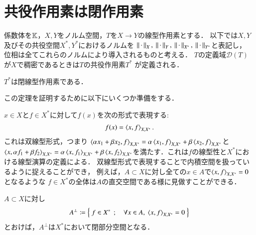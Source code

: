 \section{共役作用素は閉作用素}
	係数体を$\mathbb{K}$，$X,Y$をノルム空間，$T$を$X \rightarrow Y$の線型作用素とする．
	以下では$X,Y$及びその共役空間$X^*,Y^*$におけるノルムを
	$\Norm{\cdot}{X},\ \Norm{\cdot}{Y},\ \Norm{\cdot}{X^*},\ \Norm{\cdot}{Y^*}$と表記し，
	位相は全てこれらのノルムにより導入されるものと考える．
	$T$の定義域$\mathscr{D}(T)$が$X$で稠密であるときは$T$の共役作用素$T^*$
	が定義される．
	\begin{itembox}[l]{}
		\begin{thm}[共役作用素は閉線型]
			$T^*$は閉線型作用素である．\label{thm:T_star_closed}
		\end{thm}
	\end{itembox}

	この定理を証明するために以下にいくつか準備をする．
	
	$x \in X$と$f \in X^*$に対して$f(x)$を次の形式で表現する:
	\begin{align}
		f(x) = \inprod<x,f>_{X,X^*}.
	\end{align}
	これは双線型形式，つまり
	$\inprod<\alpha x_1 + \beta x_2,f>_{X,X^*} = \alpha \inprod<x_1,f>_{X,X^*} + \beta\inprod<x_2,f>_{X,X^*}$と$\inprod<x,\alpha f_1 + \beta f_2>_{X,X^*} = \alpha \inprod<x,f_1>_{X,X^*} + \beta\inprod<x,f_2>_{X,X^*}$を満たす．これは$f$の線型性と$X^*$における線型演算の定義による．
	双線型形式で表現することで内積空間を扱っているように捉えることができ，
	例えば，$A \subset X$に対し全ての$x \in A$で$\inprod<x,f>_{X,X^*} = 0$となるような
	$f \in X^*$の全体は$A$の直交空間である様に見做すことができる．
	
	\begin{itembox}[l]{}
		\begin{lem}
			$A \subset X$に対し
			\begin{align}
				A^{\perp} \coloneqq \Set{f \in X^*}{\forall x \in A,\ \inprod<x,f>_{X,X^*} = 0}
			\end{align}
			とおけば，$A^{\perp}$は$X^*$において閉部分空間となる．
			\label{lem:T_star_closed_1}
		\end{lem}
	\end{itembox}
	
